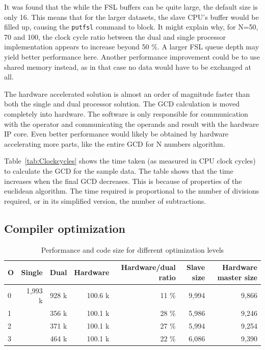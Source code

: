 \documentclass[11pt]{article}
\begin{document}
It was found that the while the FSL buffers can be quite large, the default size is only 16\cite{fsl}. This means that for the larger datasets, the slave CPU's buffer would be filled up, causing the \texttt{putfsl} command to block. It might explain why, for N=50, 70 and 100, the clock cycle ratio between the dual and single processor implementation appears to increase beyond 50 \%. A larger FSL queue depth may yield better performance here. Another performance improvement could be to use shared memory instead, as in that case no data would have to be exchanged at all.

The hardware accelerated solution is almost an order of magnitude faster than both the single and dual processor solution. The GCD calculation is moved completely into hardware. The software is only responsible for communication with the operator and communicating the operands and result with the hardware IP core. Even better performance would likely be obtained by hardware accelerating more parts, like the entire GCD for N numbers algorithm.

Table~\ref{tab:Clockcycles} shows the time taken (as measured in CPU clock cycles) to calculate the GCD for the sample data\cite{assignments}. The table shows that the time increases when the final GCD decreases. This is because of properties of the euclidean algorithm. The time required is proportional to the number of divisions required, or in its simplified version, the number of subtractions.

\subsection{Compiler optimization}

\begin{table}
  \centering
  \begin{tabular}{l|rrrrrr}
    \toprule
    O & Single  & Dual  & Hardware  & Hardware/dual ratio & Slave size & Hardware master size \\
    \midrule
    0 & 1,993 k & 928 k & 100.6 k & 11 \% & 9,994 & 9,866 \\
    1 &         & 356 k & 100.1 k & 28 \% & 5,986 & 9,246 \\
    2 &         & 371 k & 100.1 k & 27 \% & 5,994 & 9,254 \\
    3 &         & 464 k & 100.1 k & 22 \% & 6,086 & 9,390 \\
    \bottomrule
  \end{tabular}
  \caption{Performance and code size for different optimization levels}
  \label{tab:opt}
\end{table}
\end{document}
